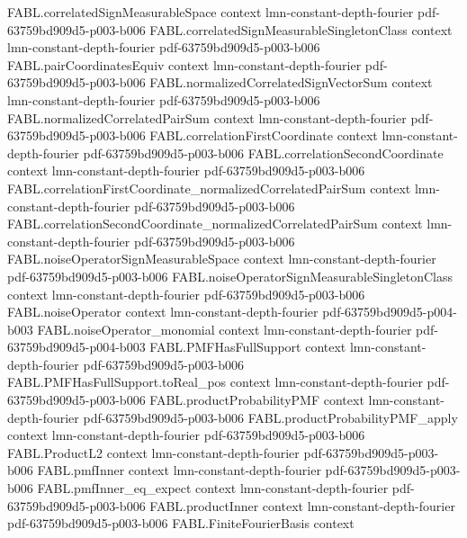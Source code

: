 \begin{theorem}[Parseval]
\proofstep
  {FABL.correlatedSignMeasurableSpace}
  {context}
  {lmn-constant-depth-fourier}
  {pdf-63759bd909d5-p003-b006}
\proofstep
  {FABL.correlatedSignMeasurableSingletonClass}
  {context}
  {lmn-constant-depth-fourier}
  {pdf-63759bd909d5-p003-b006}
\proofstep
  {FABL.pairCoordinatesEquiv}
  {context}
  {lmn-constant-depth-fourier}
  {pdf-63759bd909d5-p003-b006}
\proofstep
  {FABL.normalizedCorrelatedSignVectorSum}
  {context}
  {lmn-constant-depth-fourier}
  {pdf-63759bd909d5-p003-b006}
\proofstep
  {FABL.normalizedCorrelatedPairSum}
  {context}
  {lmn-constant-depth-fourier}
  {pdf-63759bd909d5-p003-b006}
\proofstep
  {FABL.correlationFirstCoordinate}
  {context}
  {lmn-constant-depth-fourier}
  {pdf-63759bd909d5-p003-b006}
\proofstep
  {FABL.correlationSecondCoordinate}
  {context}
  {lmn-constant-depth-fourier}
  {pdf-63759bd909d5-p003-b006}
\proofstep
  {FABL.correlationFirstCoordinate_normalizedCorrelatedPairSum}
  {context}
  {lmn-constant-depth-fourier}
  {pdf-63759bd909d5-p003-b006}
\proofstep
  {FABL.correlationSecondCoordinate_normalizedCorrelatedPairSum}
  {context}
  {lmn-constant-depth-fourier}
  {pdf-63759bd909d5-p003-b006}
\proofstep
  {FABL.noiseOperatorSignMeasurableSpace}
  {context}
  {lmn-constant-depth-fourier}
  {pdf-63759bd909d5-p003-b006}
\proofstep
  {FABL.noiseOperatorSignMeasurableSingletonClass}
  {context}
  {lmn-constant-depth-fourier}
  {pdf-63759bd909d5-p003-b006}
\proofstep
  {FABL.noiseOperator}
  {context}
  {lmn-constant-depth-fourier}
  {pdf-63759bd909d5-p004-b003}
\proofstep
  {FABL.noiseOperator_monomial}
  {context}
  {lmn-constant-depth-fourier}
  {pdf-63759bd909d5-p004-b003}
\proofstep
  {FABL.PMFHasFullSupport}
  {context}
  {lmn-constant-depth-fourier}
  {pdf-63759bd909d5-p003-b006}
\proofstep
  {FABL.PMFHasFullSupport.toReal_pos}
  {context}
  {lmn-constant-depth-fourier}
  {pdf-63759bd909d5-p003-b006}
\proofstep
  {FABL.productProbabilityPMF}
  {context}
  {lmn-constant-depth-fourier}
  {pdf-63759bd909d5-p003-b006}
\proofstep
  {FABL.productProbabilityPMF_apply}
  {context}
  {lmn-constant-depth-fourier}
  {pdf-63759bd909d5-p003-b006}
\proofstep
  {FABL.ProductL2}
  {context}
  {lmn-constant-depth-fourier}
  {pdf-63759bd909d5-p003-b006}
\proofstep
  {FABL.pmfInner}
  {context}
  {lmn-constant-depth-fourier}
  {pdf-63759bd909d5-p003-b006}
\proofstep
  {FABL.pmfInner_eq_expect}
  {context}
  {lmn-constant-depth-fourier}
  {pdf-63759bd909d5-p003-b006}
\proofstep
  {FABL.productInner}
  {context}
  {lmn-constant-depth-fourier}
  {pdf-63759bd909d5-p003-b006}
\proofstep
  {FABL.FiniteFourierBasis}
  {context}

\end{theorem}
